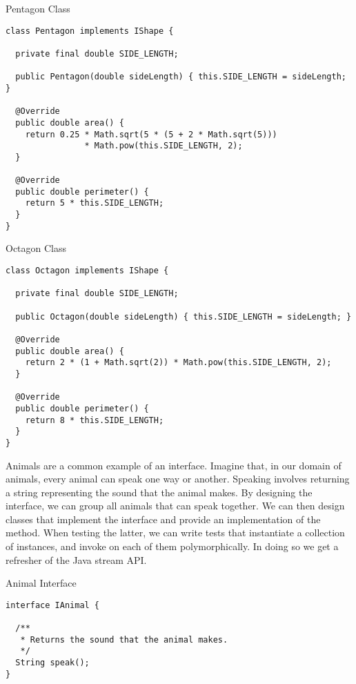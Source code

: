 \begin{cl}{Pentagon Class}
\begin{lstlisting}[language=MyJava]
class Pentagon implements IShape {
  
  private final double SIDE_LENGTH;

  public Pentagon(double sideLength) { this.SIDE_LENGTH = sideLength; }

  @Override
  public double area() {
    return 0.25 * Math.sqrt(5 * (5 + 2 * Math.sqrt(5))) 
                * Math.pow(this.SIDE_LENGTH, 2);
  }

  @Override
  public double perimeter() {
    return 5 * this.SIDE_LENGTH;
  }
}
\end{lstlisting}
\end{cl}

\begin{cl}{Octagon Class}
\begin{lstlisting}[language=MyJava]
class Octagon implements IShape {

  private final double SIDE_LENGTH;

  public Octagon(double sideLength) { this.SIDE_LENGTH = sideLength; }

  @Override
  public double area() {
    return 2 * (1 + Math.sqrt(2)) * Math.pow(this.SIDE_LENGTH, 2);
  }

  @Override
  public double perimeter() {
    return 8 * this.SIDE_LENGTH;
  }
}
\end{lstlisting}
\end{cl}

\example Animals are a common example of an interface. Imagine that, in our domain of animals, every animal can speak one way or another. Speaking involves returning a string representing the sound that the animal makes. By designing the  interface, we can group all animals that can speak together. We can then design classes that implement the  interface and provide an implementation of the  method. When testing the latter, we can write tests that instantiate a collection of  instances, and invoke  on each of them polymorphically. In doing so we get a refresher of the Java stream API.

\begin{cl}{Animal Interface}
\begin{lstlisting}[language=MyJava]
interface IAnimal {

  /**
   * Returns the sound that the animal makes.
   */
  String speak();
}
\end{lstlisting}
\end{cl}

